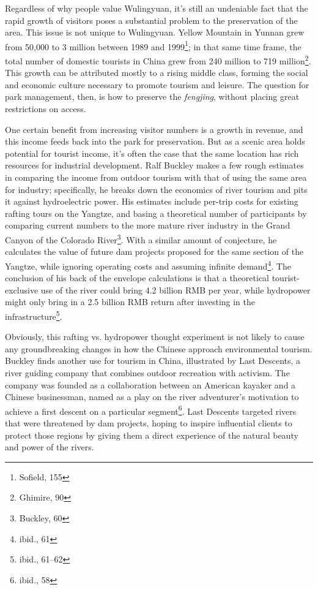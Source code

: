 Regardless of why people value Wulingyuan, it's still an undeniable fact that
the rapid growth of visitors poses a substantial problem to the preservation of
the area. This issue is not unique to Wulingyuan. Yellow Mountain in Yunnan grew
from 50,000 to 3 million between 1989 and 1999\footnote{Sofield, 155}; in that
same time frame, the total number of domestic tourists in China grew from 240
million to 719 million\footnote{Ghimire, 90}. This growth can be attributed
mostly to a rising middle class, forming the social and economic culture
necessary to promote tourism and leisure. The question for park management,
then, is how to preserve the \textit{fengjing}, without placing great
restrictions on access.

One certain benefit from increasing visitor numbers is a growth in revenue, and
this income feeds back into the park for preservation. But as a scenic area
holds potential for tourist income, it's often the case that the same location
has rich resources for industrial development. Ralf Buckley makes a few rough
estimates in comparing the income from outdoor tourism with that of using the
same area for industry; specifically, he breaks down the economics of river
tourism and pits it against hydroelectric power. His estimates include per-trip
costs for existing rafting tours on the Yangtze, and basing a theoretical number
of participants by comparing current numbers to the more mature river industry
in the Grand Canyon of the Colorado River\footnote{Buckley, 60}. With a similar
amount of conjecture, he calculates the value of future  dam projects proposed
for the same section of the Yangtze, while ignoring operating costs and assuming
infinite demand\footnote{ibid., 61}. The conclusion of his back of the envelope
calculations is that a theoretical tourist-exclusive use of the river could
bring 4.2 billion RMB per year, while hydropower might only bring in a 2.5
billion RMB return after investing in the infrastructure\footnote{ibid.,
61--62}.

Obviously, this rafting vs. hydropower thought experiment is not likely to cause
any groundbreaking changes in how the Chinese approach environmental tourism.
Buckley finds another use for tourism in China, illustrated by Last Descents, a
river guiding company that combines outdoor recreation with activism. The
company was founded as a collaboration between an American kayaker and a Chinese
businessman, named as a play on the river adventurer's motivation to achieve a
first descent on a particular segment\footnote{ibid., 58}. Last Descents
targeted rivers that were threatened by dam projects, hoping to inspire
influential clients to protect those regions by giving them a direct experience
of the natural beauty and power of the rivers.

